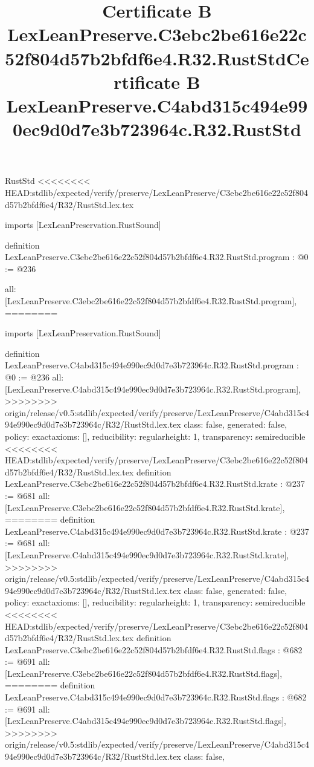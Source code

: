 \begin{lexlean}{RustStd}
<<<<<<<< HEAD:stdlib/expected/verify/preserve/LexLeanPreserve/C3ebc2be616e22c52f804d57b2bfdf6e4/R32/RustStd.lex.tex
\title{Certificate B LexLeanPreserve.C3ebc2be616e22c52f804d57b2bfdf6e4.R32.RustStd}
\begin{coremodule}
imports [LexLeanPreservation.RustSound]

definition LexLeanPreserve.C3ebc2be616e22c52f804d57b2bfdf6e4.R32.RustStd.program : @0 := @236 {
  all: [LexLeanPreserve.C3ebc2be616e22c52f804d57b2bfdf6e4.R32.RustStd.program],
========
\title{Certificate B LexLeanPreserve.C4abd315c494e990ec9d0d7e3b723964c.R32.RustStd}
\begin{coremodule}
imports [LexLeanPreservation.RustSound]

definition LexLeanPreserve.C4abd315c494e990ec9d0d7e3b723964c.R32.RustStd.program : @0 := @236 {
  all: [LexLeanPreserve.C4abd315c494e990ec9d0d7e3b723964c.R32.RustStd.program],
>>>>>>>> origin/release/v0.5:stdlib/expected/verify/preserve/LexLeanPreserve/C4abd315c494e990ec9d0d7e3b723964c/R32/RustStd.lex.tex
  class: false,
  generated: false,
  policy: exact{axioms: []},
  reducibility: regular{height: 1},
  transparency: semireducible
}
<<<<<<<< HEAD:stdlib/expected/verify/preserve/LexLeanPreserve/C3ebc2be616e22c52f804d57b2bfdf6e4/R32/RustStd.lex.tex
definition LexLeanPreserve.C3ebc2be616e22c52f804d57b2bfdf6e4.R32.RustStd.krate : @237 := @681 {
  all: [LexLeanPreserve.C3ebc2be616e22c52f804d57b2bfdf6e4.R32.RustStd.krate],
========
definition LexLeanPreserve.C4abd315c494e990ec9d0d7e3b723964c.R32.RustStd.krate : @237 := @681 {
  all: [LexLeanPreserve.C4abd315c494e990ec9d0d7e3b723964c.R32.RustStd.krate],
>>>>>>>> origin/release/v0.5:stdlib/expected/verify/preserve/LexLeanPreserve/C4abd315c494e990ec9d0d7e3b723964c/R32/RustStd.lex.tex
  class: false,
  generated: false,
  policy: exact{axioms: []},
  reducibility: regular{height: 1},
  transparency: semireducible
}
<<<<<<<< HEAD:stdlib/expected/verify/preserve/LexLeanPreserve/C3ebc2be616e22c52f804d57b2bfdf6e4/R32/RustStd.lex.tex
definition LexLeanPreserve.C3ebc2be616e22c52f804d57b2bfdf6e4.R32.RustStd.flags : @682 := @691 {
  all: [LexLeanPreserve.C3ebc2be616e22c52f804d57b2bfdf6e4.R32.RustStd.flags],
========
definition LexLeanPreserve.C4abd315c494e990ec9d0d7e3b723964c.R32.RustStd.flags : @682 := @691 {
  all: [LexLeanPreserve.C4abd315c494e990ec9d0d7e3b723964c.R32.RustStd.flags],
>>>>>>>> origin/release/v0.5:stdlib/expected/verify/preserve/LexLeanPreserve/C4abd315c494e990ec9d0d7e3b723964c/R32/RustStd.lex.tex
  class: false,
}}}
\end{coremodule}}
\end{coremodule}
\end{lexlean}
